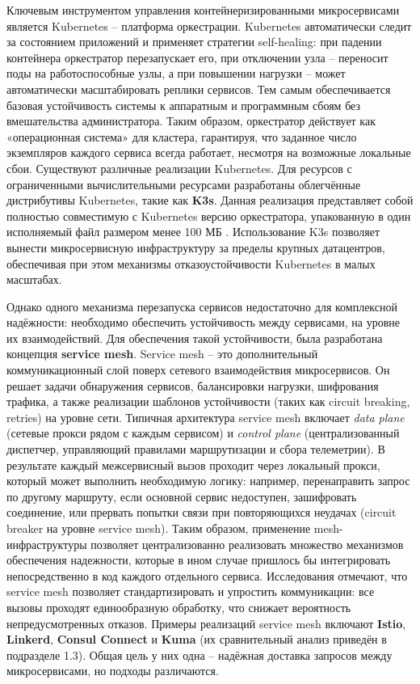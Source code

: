Ключевым инструментом управления контейнеризированными микросервисами является Kubernetes – платформа оркестрации. Kubernetes автоматически следит за состоянием приложений и применяет стратегии self-healing: при падении контейнера оркестратор перезапускает его, при отключении узла – переносит поды на работоспособные узлы, а при повышении нагрузки – может автоматически масштабировать реплики сервисов\cite{kuber}. Тем самым обеспечивается базовая устойчивость системы к аппаратным и программным сбоям без вмешательства администратора. Таким образом, оркестратор действует как «операционная система» для кластера, гарантируя, что заданное число экземпляров каждого сервиса всегда работает, несмотря на возможные локальные сбои. Существуют различные реализации Kubernetes. Для ресурсов с ограниченными вычислительными ресурсами разработаны облегчённые дистрибутивы Kubernetes, такие как \textbf{K3s}. Данная реализация представляет собой полностью совместимую с Kubernetes версию оркестратора, упакованную в один исполняемый файл размером менее 100 МБ \cite{mendezk3s}. Использование K3s позволяет вынести микросервисную инфраструктуру за пределы крупных датацентров, обеспечивая при этом механизмы отказоустойчивости Kubernetes в малых масштабах.

Однако одного механизма перезапуска сервисов недостаточно для комплексной надёжности: необходимо обеспечить устойчивость между сервисами, на уровне их взаимодействий. Для обеспечения такой устойчивости, была разработана концепция \textbf{service mesh}. Service mesh – это дополнительный коммуникационный слой поверх сетевого взаимодействия микросервисов. Он решает задачи обнаружения сервисов, балансировки нагрузки, шифрования трафика, а также реализации шаблонов устойчивости (таких как circuit breaking, retries) на уровне сети. Типичная архитектура service mesh включает \textit{data plane} (сетевые прокси рядом с каждым сервисом) и \textit{control plane} (централизованный диспетчер, управляющий правилами маршрутизации и сбора телеметрии). В результате каждый межсервисный вызов проходит через локальный прокси, который может выполнить необходимую логику: например, перенаправить запрос по другому маршруту, если основной сервис недоступен, зашифровать соединение, или прервать попытки связи при повторяющихся неудачах (circuit breaker на уровне service mesh). Таким образом, применение mesh-инфраструктуры позволяет централизованно реализовать множество механизмов обеспечения надежности, которые в ином случае пришлось бы интегрировать непосредственно в код каждого отдельного сервиса. Исследования отмечают, что service mesh позволяет стандартизировать и упростить коммуникации: все вызовы проходят единообразную обработку, что снижает вероятность непредусмотренных отказов\cite{palavesam2025}. Примеры реализаций service mesh включают \textbf{Istio}, \textbf{Linkerd}, \textbf{Consul Connect} и \textbf{Kuma} (их сравнительный анализ приведён в подразделе 1.3). Общая цель у них одна – надёжная доставка запросов между микросервисами\cite{farkiani2022}, но подходы различаются.

